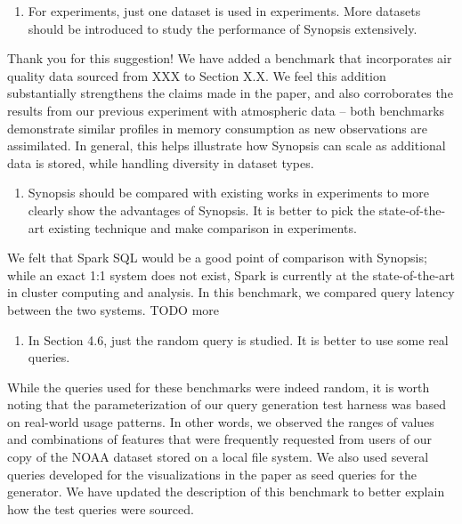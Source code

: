 \documentclass{article}
\begin{document}
\begin{enumerate}
\def\labelenumi{\arabic{enumi})}
\setcounter{enumi}{2}
\item
  For experiments, just one dataset is used in experiments. More
  datasets should be introduced to study the performance of Synopsis
  extensively.
\end{enumerate}

\begin{tcolorbox}
Thank you for this suggestion! We have added a benchmark that
incorporates air quality data sourced from XXX to Section X.X. We feel
this addition substantially strengthens the claims made in the paper,
and also corroborates the results from our previous experiment with
atmospheric data -- both benchmarks demonstrate similar profiles in
memory consumption as new observations are assimilated. In general, this
helps illustrate how Synopsis can scale as additional data is stored,
while handling diversity in dataset types.
\end{tcolorbox}

\begin{enumerate}
\def\labelenumi{\arabic{enumi})}
\setcounter{enumi}{3}
\item
  Synopsis should be compared with existing works in experiments to more
  clearly show the advantages of Synopsis. It is better to pick the
  state-of-the-art existing technique and make comparison in
  experiments.
\end{enumerate}

\begin{tcolorbox}
We felt that Spark SQL would be a good point of comparison with
Synopsis; while an exact 1:1 system does not exist, Spark is currently
at the state-of-the-art in cluster computing and analysis. In this
benchmark, we compared query latency between the two systems. TODO more
\end{tcolorbox}

\begin{enumerate}
\def\labelenumi{\arabic{enumi})}
\setcounter{enumi}{4}
\item
  In Section 4.6, just the random query is studied. It is better to use
  some real queries.
\end{enumerate}

\begin{tcolorbox}
While the queries used for these benchmarks were indeed random, it is
worth noting that the parameterization of our query generation test
harness was based on real-world usage patterns. In other words, we
observed the ranges of values and combinations of features that were
frequently requested from users of our copy of the NOAA dataset stored
on a local file system. We also used several queries developed for the
visualizations in the paper as seed queries for the generator. We have
updated the description of this benchmark to better explain how the test
queries were sourced.
\end{tcolorbox}
\end{document}
